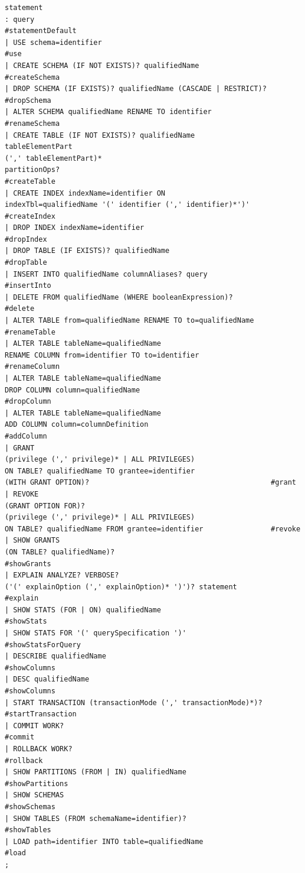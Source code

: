 \documentclass[a4paper, 12pt]{ctexart}
\begin{document}
\begin{lstlisting}
statement
: query                                                            #statementDefault
| USE schema=identifier                                            #use
| CREATE SCHEMA (IF NOT EXISTS)? qualifiedName                     #createSchema
| DROP SCHEMA (IF EXISTS)? qualifiedName (CASCADE | RESTRICT)?     #dropSchema
| ALTER SCHEMA qualifiedName RENAME TO identifier                  #renameSchema
| CREATE TABLE (IF NOT EXISTS)? qualifiedName
tableElementPart
(',' tableElementPart)*
partitionOps?                                                  #createTable
| CREATE INDEX indexName=identifier ON
indexTbl=qualifiedName '(' identifier (',' identifier)*')'     #createIndex
| DROP INDEX indexName=identifier                                  #dropIndex
| DROP TABLE (IF EXISTS)? qualifiedName                            #dropTable
| INSERT INTO qualifiedName columnAliases? query                   #insertInto
| DELETE FROM qualifiedName (WHERE booleanExpression)?             #delete
| ALTER TABLE from=qualifiedName RENAME TO to=qualifiedName        #renameTable
| ALTER TABLE tableName=qualifiedName
RENAME COLUMN from=identifier TO to=identifier                 #renameColumn
| ALTER TABLE tableName=qualifiedName
DROP COLUMN column=qualifiedName                               #dropColumn
| ALTER TABLE tableName=qualifiedName
ADD COLUMN column=columnDefinition                             #addColumn
| GRANT
(privilege (',' privilege)* | ALL PRIVILEGES)
ON TABLE? qualifiedName TO grantee=identifier
(WITH GRANT OPTION)?                                           #grant
| REVOKE
(GRANT OPTION FOR)?
(privilege (',' privilege)* | ALL PRIVILEGES)
ON TABLE? qualifiedName FROM grantee=identifier                #revoke
| SHOW GRANTS
(ON TABLE? qualifiedName)?                                     #showGrants
| EXPLAIN ANALYZE? VERBOSE?
('(' explainOption (',' explainOption)* ')')? statement        #explain
| SHOW STATS (FOR | ON) qualifiedName                              #showStats
| SHOW STATS FOR '(' querySpecification ')'                        #showStatsForQuery
| DESCRIBE qualifiedName                                           #showColumns
| DESC qualifiedName                                               #showColumns
| START TRANSACTION (transactionMode (',' transactionMode)*)?      #startTransaction
| COMMIT WORK?                                                     #commit
| ROLLBACK WORK?                                                   #rollback
| SHOW PARTITIONS (FROM | IN) qualifiedName                        #showPartitions
| SHOW SCHEMAS                                                     #showSchemas
| SHOW TABLES (FROM schemaName=identifier)?                        #showTables
| LOAD path=identifier INTO table=qualifiedName                    #load
;
\end{lstlisting}
\end{document}
